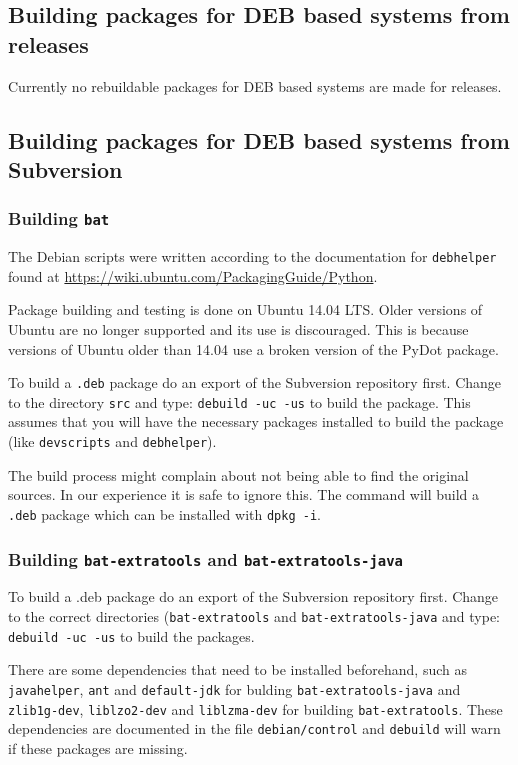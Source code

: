 \documentclass[10pt,a4paper]{article}
\begin{document}
\subsection{Building packages for DEB based systems from releases}

Currently no rebuildable packages for DEB based systems are made for releases.

\subsection{Building packages for DEB based systems from Subversion}

\subsubsection{Building \texttt{bat}}

The Debian scripts were written according to the documentation for
\texttt{debhelper} found at \url{https://wiki.ubuntu.com/PackagingGuide/Python}.

Package building and testing is done on Ubuntu 14.04 LTS. Older versions of
Ubuntu are no longer supported and its use is discouraged. This is because
versions of Ubuntu older than 14.04 use a broken version of the PyDot package.

To build a \texttt{.deb} package do an export of the Subversion repository
first.  Change to the directory \texttt{src} and type:
\texttt{debuild -uc -us} to build the package. This assumes that you will have
the necessary packages installed to build the package (like \texttt{devscripts}
and \texttt{debhelper}).

The build process might complain about not being able to find the original
sources. In our experience it is safe to ignore this. The command will build a
\texttt{.deb} package which can be installed with \texttt{dpkg -i}.

\subsubsection{Building \texttt{bat-extratools} and
\texttt{bat-extratools-java}}

To build a .deb package do an export of the Subversion repository first. Change
to the correct directories (\texttt{bat-extratools} and 
\texttt{bat-extratools-java} and type: \texttt{debuild -uc -us} to
build the packages.

There are some dependencies that need to be installed beforehand, such as
\texttt{javahelper}, \texttt{ant} and \texttt{default-jdk} for bulding
\texttt{bat-extratools-java} and \texttt{zlib1g-dev}, \texttt{liblzo2-dev}
and \texttt{liblzma-dev} for building \texttt{bat-extratools}. These
dependencies are documented in the file \texttt{debian/control} and
\texttt{debuild} will warn if these packages are missing.
\end{document}
